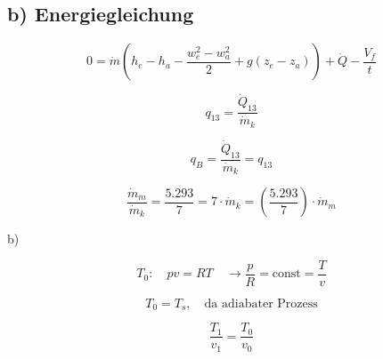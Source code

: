 \subsection*{b) Energiegleichung}

\begin{equation}
0 = \dot{m} \left( h_e - h_a - \frac{w_e^2 - w_a^2}{2} + g(z_e - z_a) \right) + \dot{Q} - \frac{V_f}{t}
\end{equation}

\begin{equation}
q_{13} = \frac{\dot{Q}_{13}}{\dot{m}_k}
\end{equation}

\begin{equation}
q_{B} = \frac{\dot{Q}_{13}}{\dot{m}_k} = q_{13}
\end{equation}

\begin{equation}
\frac{\dot{m}_m}{\dot{m}_k} = \frac{5.293}{7} = 7 \cdot \dot{m}_k = \left( \frac{5.293}{7} \right) \cdot \dot{m}_m
\end{equation}

b)

\[
T_0 : \quad p v = R T \quad \rightarrow \frac{p}{R} = \text{const} = \frac{T}{v}
\]

\[
T_0 = T_s, \quad \text{da adiabater Prozess}
\]

\[
\frac{T_1}{v_1} = \frac{T_0}{v_0}
\]